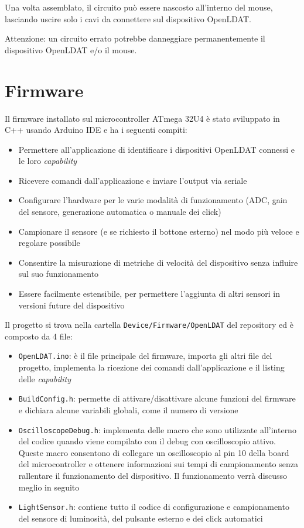 Una volta assemblato, il circuito può essere nascosto all'interno del mouse, lasciando uscire solo i cavi da connettere sul dispositivo OpenLDAT.

Attenzione: un circuito errato potrebbe danneggiare permanentemente il dispositivo OpenLDAT e/o il mouse.

\section{Firmware}
Il firmware installato sul microcontroller ATmega 32U4 è stato sviluppato in C++ usando Arduino IDE e ha i seguenti compiti:
\begin{itemize}
	\item Permettere all'applicazione di identificare i dispositivi OpenLDAT connessi e le loro \textit{capability}
	\item Ricevere comandi dall'applicazione e inviare l'output via seriale
	\item Configurare l'hardware per le varie modalità di funzionamento (ADC, gain del sensore, generazione automatica o manuale dei click)
	\item Campionare il sensore (e se richiesto il bottone esterno) nel modo più veloce e regolare possibile
	\item Consentire la misurazione di metriche di velocità del dispositivo senza influire sul suo funzionamento
	\item Essere facilmente estensibile, per permettere l'aggiunta di altri sensori in versioni future del dispositivo
\end{itemize}

Il progetto si trova nella cartella \texttt{Device/Firmware/OpenLDAT} del repository ed è composto da 4 file:
\begin{itemize}
	\item \texttt{OpenLDAT.ino}: è il file principale del firmware, importa gli altri file del progetto, implementa la ricezione dei comandi dall'applicazione e il listing delle \textit{capability}
	\item \texttt{BuildConfig.h}: permette di attivare/disattivare alcune funzioni del firmware e dichiara alcune variabili globali, come il numero di versione
	\item \texttt{OscilloscopeDebug.h}: implementa delle macro che sono utilizzate all'interno del codice quando viene compilato con il debug con oscilloscopio attivo. Queste macro consentono di collegare un oscilloscopio al pin 10 della board del microcontroller e ottenere informazioni sui tempi di campionamento senza rallentare il funzionamento del dispositivo. Il funzionamento verrà discusso meglio in seguito
	\item \texttt{LightSensor.h}: contiene tutto il codice di configurazione e campionamento del sensore di luminosità, del pulsante esterno e dei click automatici
\end{itemize}

